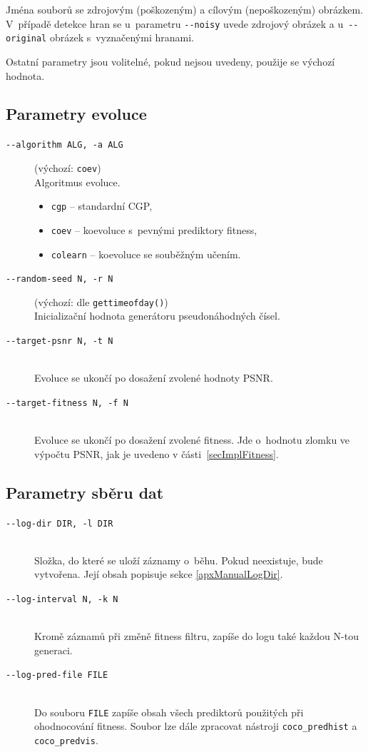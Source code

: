 Jména souborů se zdrojovým (poškozeným) a cílovým (nepoškozeným) obrázkem. V~případě detekce hran se u~parametru \texttt{-{}-noisy} uvede zdrojový obrázek a u~\texttt{-{}-original} obrázek s~vyznačenými hranami.

Ostatní parametry jsou volitelné, pokud nejsou uvedeny, použije se výchozí hodnota.

\subsection{Parametry evoluce}

\newcommand\cmdarglist[1]{
    \begin{description}#1\end{description}
}

\newcommand\cmdarg[2]{
    \item[\texttt{#1}] \hfill \\
    #2
}

\newcommand\cmdargdef[3]{
    \item[\texttt{#1}] (výchozí: #2) \hfill \\
    #3
}

\cmdarglist{
    \cmdargdef{-{}-algorithm ALG, -a ALG}{\texttt{coev}}{
        Algoritmus evoluce.
        \begin{itemize}
            \item \texttt{cgp} -- standardní CGP,
            \item \texttt{coev} -- koevoluce s~pevnými prediktory fitness,
            \item \texttt{colearn} -- koevoluce se souběžným učením.
        \end{itemize}
    }

    \cmdargdef{-{}-random-seed N, -r N}{dle \texttt{gettimeofday()}}{
        Inicializační hodnota generátoru pseudonáhodných čísel.
    }

    \cmdarg{-{}-target-psnr N, -t N}{
        Evoluce se ukončí po dosažení zvolené hodnoty PSNR.
    }

    \cmdarg{-{}-target-fitness N, -f N}{
        Evoluce se ukončí po dosažení zvolené fitness. Jde o~hodnotu zlomku ve výpočtu PSNR, jak je uvedeno v části~\ref{secImplFitness}.
    }
}

\subsection{Parametry sběru dat}

\cmdarglist{
    \cmdarg{-{}-log-dir DIR, -l DIR}{
        Složka, do které se uloží záznamy o~běhu. Pokud neexistuje, bude vytvořena. Její obsah popisuje sekce \ref{apxManualLogDir}.
    }

    \cmdarg{-{}-log-interval N, -k N}{
        Kromě záznamů při změně fitness filtru, zapíše do logu také každou N-tou generaci.
    }

    \cmdarg{-{}-log-pred-file FILE}{
        Do souboru \texttt{FILE} zapíše obsah všech prediktorů použitých při ohodnocování fitness. Soubor lze dále zpracovat nástroji \texttt{coco\_predhist} a \texttt{coco\_predvis}.
    }
}

